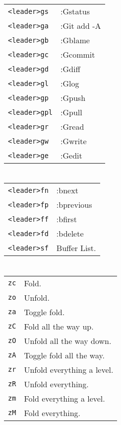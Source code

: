 \begin{multicols}{3}
\section{}
\begin{tabular}{@{}ll@{}}
	\verb!<leader>gs! & :Gstatus \\
	\verb!<leader>ga! & :Git add -A \\
	\verb!<leader>gb! & :Gblame \\
	\verb!<leader>gc! & :Gcommit \\
	\verb!<leader>gd! & :Gdiff \\
	\verb!<leader>gl! & :Glog \\
	\verb!<leader>gp! & :Gpush \\
	\verb!<leader>gpl! & :Gpull  \\
	\verb!<leader>gr! & :Gread \\
	\verb!<leader>gw! & :Gwrite \\
	\verb!<leader>ge! & :Gedit \\
\end{tabular}

\section{}
\begin{tabular}{@{}ll@{}}
	\verb!<leader>fn! & :bnext \\
	\verb!<leader>fp! & :bprevious \\
	\verb!<leader>ff! & :bfirst \\
	\verb!<leader>fd! & :bdelete \\
	\verb!<leader>sf! & Buffer List. \\
\end{tabular}

\section{}
\begin{tabular}{@{}ll@{}}
	\verb!zc! & Fold. \\
	\verb!zo! & Unfold. \\
	\verb!za! & Toggle fold. \\
	\verb!zC! & Fold all the way up. \\
	\verb!zO! & Unfold all the way down. \\
	\verb!zA! & Toggle fold all the way. \\
	\verb!zr! & Unfold everything a level.\\
	\verb!zR! & Unfold everything.\\
	\verb!zm! & Fold everything a level. \\
	\verb!zM! & Fold everything. \\
\end{tabular}


\end{multicols}

